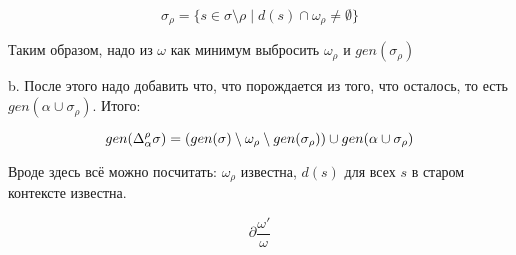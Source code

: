             $$\sigma_\rho=\{s\in\sigma\setminus\rho \mid d(s)\cap\omega_\rho\ne\emptyset\}$$
			
          Таким образом, надо из $\omega$ как минимум выбросить $\omega_\rho$ и $gen(\sigma_\rho)$

		b. После этого надо добавить что, что порождается из того, что осталось, то есть $gen(\alpha\cup\sigma_\rho)$. Итого:

			$$gen(\Delta_\alpha^\rho\sigma)=(gen(\sigma)\setminus\omega_\rho\setminus gen(\sigma_\rho))\cup gen(\alpha\cup\sigma_\rho)$$

     Вроде здесь всё можно посчитать: $\omega_\rho$ известна, $d(s)$ для всех $s$ в старом контексте известна. 
	 
$$\partial\dfrac{\omega'}{\omega}$$


